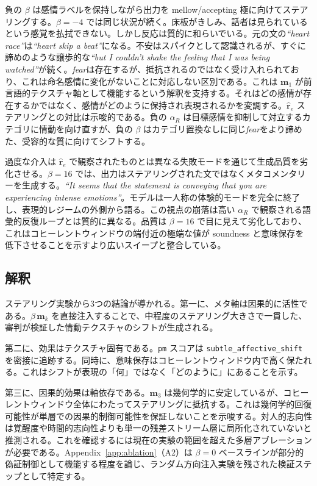 負の $\beta$ は感情ラベルを保持しながら出力を mellow/accepting 極に向けてステアリングする。$\beta=-4$ では同じ状況が続く。床板がきしみ、話者は見られているという感覚を払拭できない。しかし反応は質的に和らいでいる。元の文の\textit{``heart race''}は\textit{``heart skip a beat''}になる。不安はスパイクとして認識されるが、すぐに諦めのような譲歩的な\textit{``but I couldn't shake the feeling that I was being watched''}が続く。\textit{fear}は存在するが、抵抗されるのではなく受け入れられており、これは命名感情に変化がないことに対応しない区別である。これは $\mathbf{m}_1$ が前言語的テクスチャ軸として機能するという解釈を支持する。それはどの感情が存在するかではなく、感情がどのように保持され表現されるかを変調する。$\hat{\mathbf{r}}_e$ ステアリングとの対比は示唆的である。負の $\alpha_R$ は目標感情を抑制して対立するカテゴリに情動を向け直すが、負の $\beta$ はカテゴリ置換なしに同じ\textit{fear}をより諦めた、受容的な質に向けてシフトする。\par

過度な介入は $\hat{\mathbf{r}}_e$ で観察されたものとは異なる失敗モードを通じて生成品質を劣化させる。$\beta=16$ では、出力はステアリングされた文ではなくメタコメンタリーを生成する。\textit{``It seems that the statement is conveying that you are experiencing intense emotions''}。モデルは一人称の体験的モードを完全に終了し、表現的レジームの外側から語る。この視点の崩落は高い $\alpha_R$ で観察される語彙的反復ループとは質的に異なる。品質は $\beta=16$ で目に見えて劣化しており、これはコヒーレントウィンドウの端付近の極端な値が soundness と意味保存を低下させることを示すより広いスイープと整合している。\par

\subsection{解釈}

ステアリング実験から3つの結論が導かれる。第一に、メタ軸は因果的に活性である。$\beta\,\mathbf{m}_k$ を直接注入することで、中程度のステアリング大きさで一貫した、審判が検証した情動テクスチャのシフトが生成される。\par

第二に、効果はテクスチャ固有である。\texttt{pm} スコアは \texttt{subtle\_affective\_shift} を密接に追跡する。同時に、意味保存はコヒーレントウィンドウ内で高く保たれる。これはシフトが表現の「何」ではなく「どのように」にあることを示す。\par

第三に、因果的効果は軸依存である。$\mathbf{m}_3$ は幾何学的に安定しているが、コヒーレントウィンドウ全体にわたってステアリングに抵抗する。これは幾何学的回復可能性が単層での因果的制御可能性を保証しないことを示唆する。対人的志向性は覚醒度や時間的志向性よりも単一の残差ストリーム層に局所化されていないと推測される。これを確認するには現在の実験の範囲を超えた多層アブレーションが必要である。Appendix~\ref{app:ablation}（A2）は $\beta=0$ ベースラインが部分的偽証制御として機能する程度を論じ、ランダム方向注入実験を残された検証ステップとして特定する。\par

